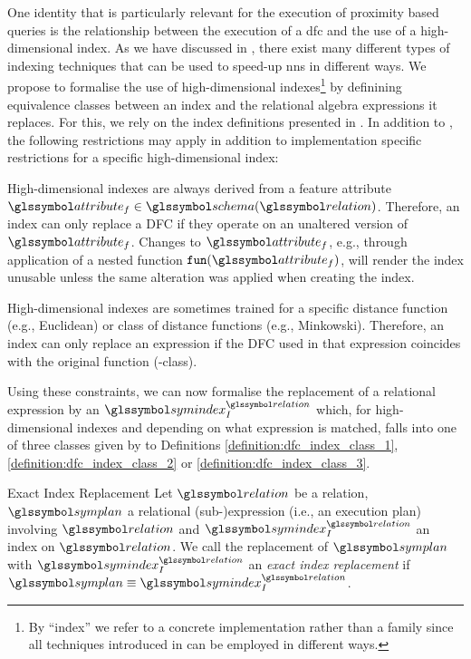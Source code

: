 One identity that is particularly relevant for the execution of proximity based queries is the relationship between the execution of a \acrshort{dfc} and the use of a high-dimensional index. As we have discussed in , there exist many different types of indexing techniques that can be used to speed-up \acrshort{nns} in different ways. We propose to formalise the use of high-dimensional indexes\footnote{By ``index'' we refer to a concrete implementation rather than a family since all techniques introduced in  can be employed in different ways.} by definining equivalence classes between an index and the relational algebra expressions it replaces. For this, we rely on the index definitions presented in . In addition to , the following restrictions may apply in addition to implementation specific restrictions for a specific high-dimensional index: 
\begin{enumerate*}[label=(\roman*)]
    \item High-dimensional indexes are always derived from a feature attribute $\attribute_f \in \schema(\relation)$. Therefore, an index can only replace a DFC if they operate on an unaltered version of $\attribute_f$. Changes to $\attribute_f$, e.g., through application of a nested function $\mathtt{fun}(\attribute_f)$, will render the index unusable unless the same alteration was applied when creating the index.
    \item High-dimensional indexes are sometimes trained for a specific distance function (e.g., Euclidean) or class of distance functions (e.g., Minkowski). Therefore, an index can only replace an expression if the DFC used in that expression coincides with the original function (-class).
\end{enumerate*} Using these constraints, we can now formalise the replacement of a relational expression by an $\symindex^{\relation}_{I}$ which, for high-dimensional indexes and depending on what expression is matched, falls into one of three classes given by to Definitions \ref{definition:dfc_index_class_1}, \ref{definition:dfc_index_class_2} or \ref{definition:dfc_index_class_3}.

\begin{definition}[label=definition:definition:index_replacement_exact]{Exact Index Replacement}{}
    Let $\relation$ be a relation, $\symplan$ a relational (sub-)expression (i.e., an execution plan) involving $\relation$ and $\symindex^{\relation}_{I}$ an index on $\relation$. We call the replacement of $\symplan$ with $\symindex^{\relation}_{I}$ an \emph{exact index replacement} if $\symplan \equiv \symindex^{\relation}_{I}$.
\end{definition}

